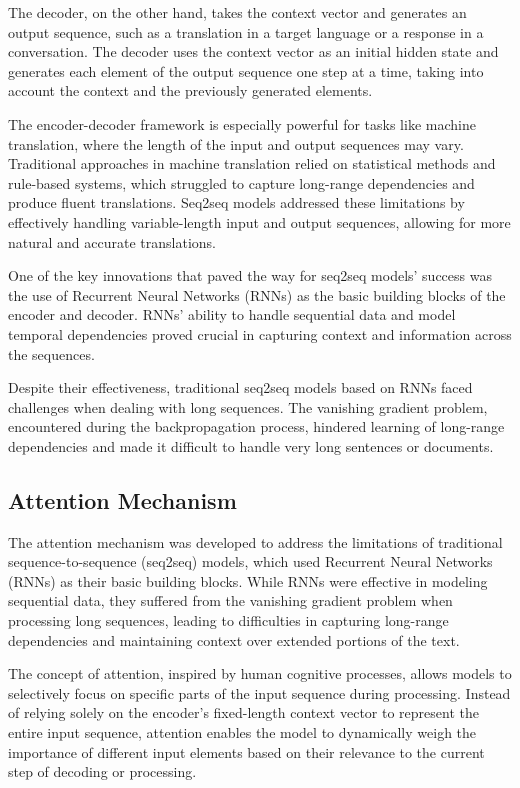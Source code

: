 \documentclass{article}
\begin{document}
The decoder, on the other hand, takes the context vector and generates an output sequence, such as a translation in a target language or a response in a conversation. The decoder uses the context vector as an initial hidden state and generates each element of the output sequence one step at a time, taking into account the context and the previously generated elements.

The encoder-decoder framework is especially powerful for tasks like machine translation, where the length of the input and output sequences may vary. Traditional approaches in machine translation relied on statistical methods and rule-based systems, which struggled to capture long-range dependencies and produce fluent translations. Seq2seq models addressed these limitations by effectively handling variable-length input and output sequences, allowing for more natural and accurate translations.

One of the key innovations that paved the way for seq2seq models' success was the use of Recurrent Neural Networks (RNNs) as the basic building blocks of the encoder and decoder. RNNs' ability to handle sequential data and model temporal dependencies proved crucial in capturing context and information across the sequences.

Despite their effectiveness, traditional seq2seq models based on RNNs faced challenges when dealing with long sequences. The vanishing gradient problem, encountered during the backpropagation process, hindered learning of long-range dependencies and made it difficult to handle very long sentences or documents.


\subsection{Attention Mechanism}

The attention mechanism was developed to address the limitations of traditional sequence-to-sequence (seq2seq) models, which used Recurrent Neural Networks (RNNs) as their basic building blocks. While RNNs were effective in modeling sequential data, they suffered from the vanishing gradient problem when processing long sequences, leading to difficulties in capturing long-range dependencies and maintaining context over extended portions of the text.

The concept of attention, inspired by human cognitive processes, allows models to selectively focus on specific parts of the input sequence during processing. Instead of relying solely on the encoder's fixed-length context vector to represent the entire input sequence, attention enables the model to dynamically weigh the importance of different input elements based on their relevance to the current step of decoding or processing.
\end{document}

